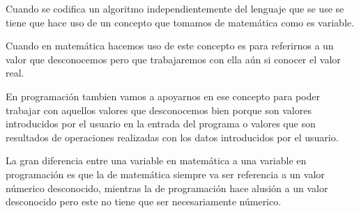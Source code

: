 Cuando se codifica un algoritmo independientemente del lenguaje que se use se tiene que hace uso de un concepto que tomamos de matemática como es variable.

Cuando en matemática hacemos uso de este concepto es para referirnos a un valor que desconocemos pero que trabajaremos con ella aún si conocer el valor real. 

En programación tambien vamos a apoyarnos en ese concepto para poder trabajar con aquellos valores que desconocemos bien porque son valores introducidos por el usuario en la entrada del programa o valores que son resultados de operaciones realizadas con los datos introducidos por el usuario.

La gran diferencia entre una variable en matemática a una variable en programación es que la de matemática siempre va ser referencia a un valor númerico desconocido, mientras la de programación hace alusión a un valor desconocido pero este no tiene  que ser necesariamente númerico.